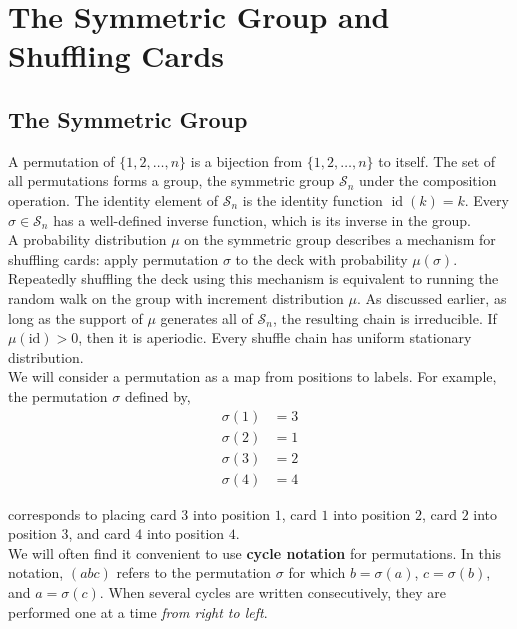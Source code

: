\documentclass[12pt]{article}
\DeclareMathOperator*{\id}{\text{id}}
\begin{document}
\section{The Symmetric Group and Shuffling Cards}

\subsection{The Symmetric Group}

A permutation of $\{1, 2, \ldots, n\}$ is a bijection from $\{1, 2, \ldots, n\}$ to itself. The set of all permutations forms a group, the symmetric group $\mathcal{S}_n$ under the composition operation. The identity element of $\mathcal{S}_n$ is the identity function $\id(k) = k$. Every $\sigma \in \mathcal{S}_n$ has a well-defined inverse function, which is its inverse in the group.\\

A probability distribution $\mu$ on the symmetric group describes a mechanism for shuffling cards: apply permutation $\sigma$ to the deck with probability $\mu(\sigma)$. Repeatedly shuffling the deck using this mechanism is equivalent to running the random walk on the group with increment distribution $\mu$. As discussed earlier, as long as the support of $\mu$ generates all of $\mathcal{S}_n$, the resulting chain is irreducible. If $\mu(\text{id}) > 0$, then it is aperiodic. Every shuffle chain has uniform stationary distribution.\\

We will consider a permutation as a map from positions to labels. For example, the permutation $\sigma$ defined by,
\begin{align*}
\sigma(1) &= 3\\
\sigma(2) &= 1\\
\sigma(3) &= 2\\
\sigma(4) &= 4
\end{align*}

corresponds to placing card $3$ into position $1$, card $1$ into position $2$, card $2$ into position $3$, and card $4$ into position $4$.\\

We will often find it convenient to use \textbf{cycle notation} for permutations. In this notation, $(abc)$ refers to the permutation $\sigma$ for which $b = \sigma(a)$, $c = \sigma(b)$, and $a = \sigma(c)$. When several cycles are written consecutively, they are performed one at a time \textit{from right to left}.\\
\end{document}
